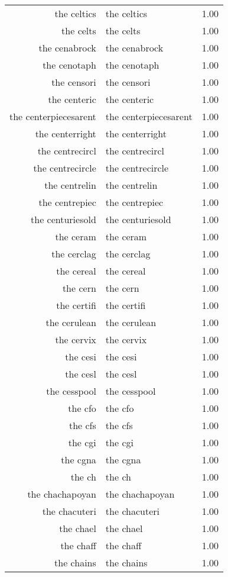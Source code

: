 \begin{table}[ht]
\begin{tabular}{rlr}
  the celtics & the celtics & 1.00 \\ 
  the celts & the celts & 1.00 \\ 
  the cenabrock & the cenabrock & 1.00 \\ 
  the cenotaph & the cenotaph & 1.00 \\ 
  the censori & the censori & 1.00 \\ 
  the centeric & the centeric & 1.00 \\ 
  the centerpiecesarent & the centerpiecesarent & 1.00 \\ 
  the centerright & the centerright & 1.00 \\ 
  the centrecircl & the centrecircl & 1.00 \\ 
  the centrecircle & the centrecircle & 1.00 \\ 
  the centrelin & the centrelin & 1.00 \\ 
  the centrepiec & the centrepiec & 1.00 \\ 
  the centuriesold & the centuriesold & 1.00 \\ 
  the ceram & the ceram & 1.00 \\ 
  the cerclag & the cerclag & 1.00 \\ 
  the cereal & the cereal & 1.00 \\ 
  the cern & the cern & 1.00 \\ 
  the certifi & the certifi & 1.00 \\ 
  the cerulean & the cerulean & 1.00 \\ 
  the cervix & the cervix & 1.00 \\ 
  the cesi & the cesi & 1.00 \\ 
  the cesl & the cesl & 1.00 \\ 
  the cesspool & the cesspool & 1.00 \\ 
  the cfo & the cfo & 1.00 \\ 
  the cfs & the cfs & 1.00 \\ 
  the cgi & the cgi & 1.00 \\ 
  the cgna & the cgna & 1.00 \\ 
  the ch & the ch & 1.00 \\ 
  the chachapoyan & the chachapoyan & 1.00 \\ 
  the chacuteri & the chacuteri & 1.00 \\ 
  the chael & the chael & 1.00 \\ 
  the chaff & the chaff & 1.00 \\ 
  the chains & the chains & 1.00 \\ 

\end{tabular}
\end{table}
